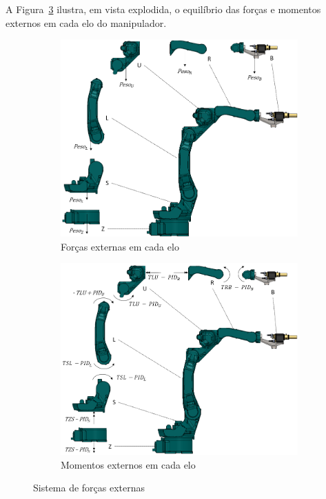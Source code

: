 A Figura~\ref{fig::sisfex} ilustra, em vista explodida, o equilíbrio das forças e
momentos externos em cada elo do manipulador.

\begin{figure}[h]
    \centering
    \begin{subfigure}[b]{0.6\textwidth}
        \includegraphics[width=\textwidth]{figs/forcas_ext}
        \caption{Forças externas em cada elo}
        \label{fig::fex}
    \end{subfigure}
    \quad %
    \begin{subfigure}[b]{0.6\textwidth}
        \includegraphics[width=\textwidth]{figs/mom_ext}
        \caption{Momentos externos em cada elo}
        \label{fig::mex}
    \end{subfigure}
    \caption{Sistema de forças externas}\label{fig::sisfex}
\end{figure}

